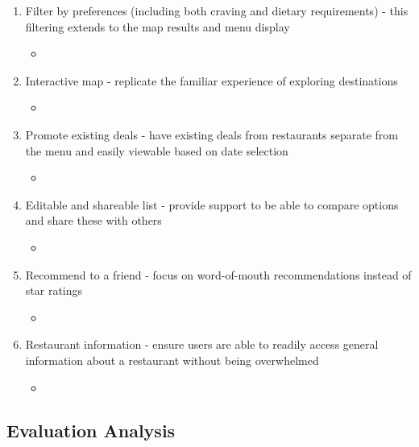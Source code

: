 \documentclass[a4 paper, 12pt]{article}
\begin{document}
\begin{enumerate}
    \item Filter by preferences (including both craving and dietary requirements) - this filtering extends to the map results and menu display
        \begin{itemize}
            \item 
        \end{itemize}

    \item Interactive map - replicate the familiar experience of exploring destinations
        \begin{itemize}
            \item 
        \end{itemize}

    \item Promote existing deals - have existing deals from restaurants separate from the menu and easily viewable based on date selection
        \begin{itemize}
            \item 
        \end{itemize}

    \item Editable and shareable list - provide support to be able to compare options and share these with others
        \begin{itemize}             
            \item 
        \end{itemize}

    \item Recommend to a friend - focus on word-of-mouth recommendations instead of star ratings
        \begin{itemize}
            \item 
        \end{itemize}

    \item Restaurant information - ensure users are able to readily access general information about a restaurant without being overwhelmed 
        \begin{itemize} 
            \item   
        \end{itemize}
\end{enumerate}


\subsection{Evaluation Analysis}
\end{document}
